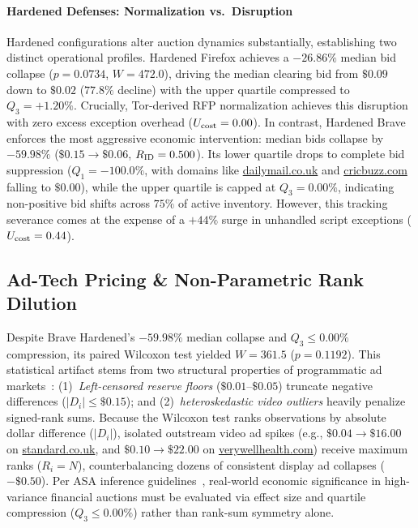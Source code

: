 \paragraph{Hardened Defenses: Normalization vs.\ Disruption}
Hardened configurations alter auction dynamics substantially, establishing two distinct operational profiles. Hardened Firefox achieves a $-26.86\%$ median bid collapse ($p = 0.0734$, $W = 472.0$), driving the median clearing bid from $\$0.09$ down to $\$0.02$ ($77.8\%$ decline) with the upper quartile compressed to $Q_3 = +1.20\%$. 
Crucially, Tor-derived RFP normalization achieves this disruption with zero excess exception overhead ($U_{\text{cost}} = 0.00$). In contrast, Hardened Brave enforces the most aggressive economic intervention: median bids collapse by $-59.98\%$ ($\$0.15 \to \$0.06$, $R_{\text{ID}} = 0.500$). 
Its lower quartile drops to complete bid suppression ($Q_1 = -100.0\%$, with domains like \url{dailymail.co.uk} and \url{cricbuzz.com} falling to $\$0.00$), while the upper quartile is capped at $Q_3 = 0.00\%$, indicating non-positive bid shifts across $75\%$ of active inventory. 
However, this tracking severance comes at the expense of a $+44\%$ surge in unhandled script exceptions  ($U_{\text{cost}} = 0.44$).

\subsection{Ad-Tech Pricing \& Non-Parametric Rank Dilution}
\label{subsec:rank_dilution}

Despite Brave Hardened's $-59.98\%$ median collapse and $Q_3 \le 0.00\%$ compression, its paired Wilcoxon test yielded $W = 361.5$ ($p = 0.1192$). 
This statistical artifact stems from two structural properties of programmatic ad markets~\cite{barysei2023investigating}: 
(1)~\textit{Left-censored reserve floors} ($\$0.01$--$\$0.05$) truncate negative differences ($|D_i| \le \$0.15$); and 
(2)~\textit{heteroskedastic video outliers} heavily penalize signed-rank sums. 
Because the Wilcoxon test ranks observations by absolute dollar difference ($|D_i|$), isolated outstream video ad spikes (e.g., $\$0.04 \to \$16.00$ on \url{standard.co.uk}, and $\$0.10 \to \$22.00$ on \url{verywellhealth.com}) receive maximum ranks ($R_i = N$), counterbalancing dozens of consistent display ad collapses ($-\$0.50$). 
Per ASA inference guidelines~\cite{wasserstein2016asa}, real-world economic significance in high-variance financial auctions must be evaluated via effect size and quartile compression ($Q_3 \le 0.00\%$) rather than rank-sum symmetry alone.

